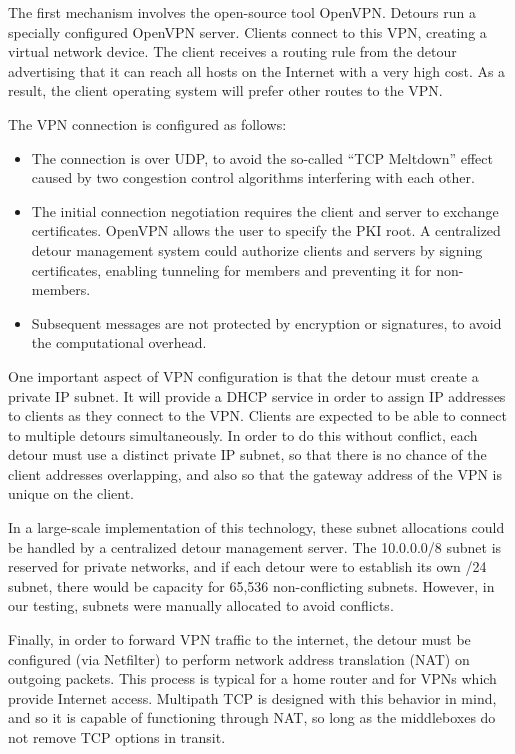 The first mechanism involves the open-source tool OpenVPN. Detours run a
specially configured OpenVPN server. Clients connect to this VPN, creating a
virtual network device. The client receives a routing rule from the detour
advertising that it can reach all hosts on the Internet with a very high cost.
As a result, the client operating system will prefer other routes to the VPN.

The VPN connection is configured as follows:

\begin{itemize}
\item The connection is over UDP, to avoid the so-called ``TCP Meltdown'' effect
  caused by two congestion control algorithms interfering with each other.
\item The initial connection negotiation requires the client and server to
  exchange certificates. OpenVPN allows the user to specify the PKI root. A
  centralized detour management system could authorize clients and servers by
  signing certificates, enabling tunneling for members and preventing it for
  non-members.
\item Subsequent messages are not protected by encryption or signatures, to
  avoid the computational overhead.
\end{itemize}

One important aspect of VPN configuration is that the detour must create a
private IP subnet. It will provide a DHCP service in order to assign IP
addresses to clients as they connect to the VPN. Clients are expected to be able
to connect to multiple detours simultaneously. In order to do this without
conflict, each detour must use a distinct private IP subnet, so that there is no
chance of the client addresses overlapping, and also so that the gateway address
of the VPN is unique on the client.

In a large-scale implementation of this technology, these subnet allocations
could be handled by a centralized detour management server. The 10.0.0.0/8
subnet is reserved for private networks, and if each detour were to establish
its own /24 subnet, there would be capacity for 65,536 non-conflicting subnets.
However, in our testing, subnets were manually allocated to avoid conflicts.

Finally, in order to forward VPN traffic to the internet, the detour must be
configured (via Netfilter) to perform network address translation (NAT) on
outgoing packets. This process is typical for a home router and for VPNs which
provide Internet access. Multipath TCP is designed with this behavior in mind,
and so it is capable of functioning through NAT, so long as the middleboxes do
not remove TCP options in transit.

